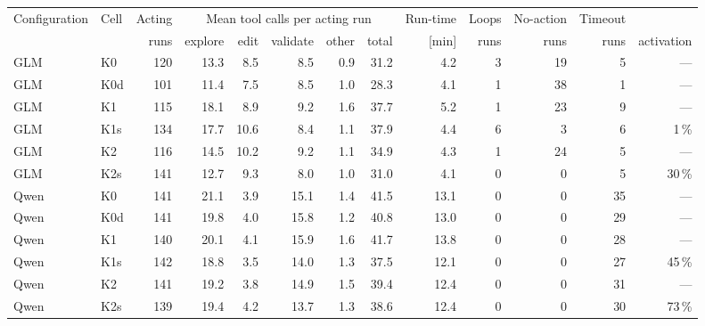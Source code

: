\begin{tabular}{@{}llrrrrrrrrrrr@{}}
  \toprule
  Configuration & Cell & Acting & \multicolumn{5}{c}{Mean tool calls per acting run} & Run-time & Loops & No-action & Timeout & \skillfile{} \\
  \cmidrule(lr){4-8}
   & & runs & explore & edit & validate & other & total & [min] & runs & runs & runs & activation \\
  \midrule
  GLM & K0 & 120 & 13.3 & 8.5 & 8.5 & 0.9 & 31.2 & 4.2 & 3 & 19 & 5 & --- \\
  \rowcolor{black!6} GLM & K0d & 101 & 11.4 & 7.5 & 8.5 & 1.0 & 28.3 & 4.1 & 1 & 38 & 1 & --- \\
  GLM & K1 & 115 & 18.1 & 8.9 & 9.2 & 1.6 & 37.7 & 5.2 & 1 & 23 & 9 & --- \\
  \rowcolor{black!6} GLM & K1s & 134 & 17.7 & 10.6 & 8.4 & 1.1 & 37.9 & 4.4 & 6 & 3 & 6 & 1\,\% \\
  GLM & K2 & 116 & 14.5 & 10.2 & 9.2 & 1.1 & 34.9 & 4.3 & 1 & 24 & 5 & --- \\
  \rowcolor{black!6} GLM & K2s & 141 & 12.7 & 9.3 & 8.0 & 1.0 & 31.0 & 4.1 & 0 & 0 & 5 & 30\,\% \\
  Qwen & K0 & 141 & 21.1 & 3.9 & 15.1 & 1.4 & 41.5 & 13.1 & 0 & 0 & 35 & --- \\
  \rowcolor{black!6} Qwen & K0d & 141 & 19.8 & 4.0 & 15.8 & 1.2 & 40.8 & 13.0 & 0 & 0 & 29 & --- \\
  Qwen & K1 & 140 & 20.1 & 4.1 & 15.9 & 1.6 & 41.7 & 13.8 & 0 & 0 & 28 & --- \\
  \rowcolor{black!6} Qwen & K1s & 142 & 18.8 & 3.5 & 14.0 & 1.3 & 37.5 & 12.1 & 0 & 0 & 27 & 45\,\% \\
  Qwen & K2 & 141 & 19.2 & 3.8 & 14.9 & 1.5 & 39.4 & 12.4 & 0 & 0 & 31 & --- \\
  \rowcolor{black!6} Qwen & K2s & 139 & 19.4 & 4.2 & 13.7 & 1.3 & 38.6 & 12.4 & 0 & 0 & 30 & 73\,\% \\
  \bottomrule
\end{tabular}
